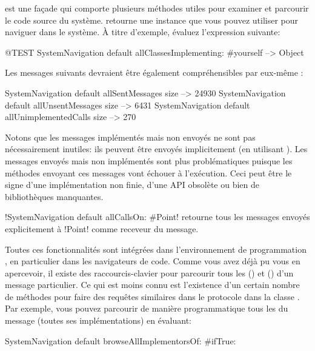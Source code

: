 \documentclass[a4paper,10pt,twoside]{book}
\begin{document}
 est une façade qui comporte plusieurs méthodes utiles pour examiner et parcourir le code source du système.
  retourne une instance que vous pouvez utiliser pour naviguer dans le système. À titre d'exemple, évaluez l'expression suivante:

\begin{code}{@TEST}
SystemNavigation default allClassesImplementing: #yourself --> {Object}
\end{code}

Les messages suivants devraient être également compréhensibles par eux-même :

\begin{code}{}
SystemNavigation default allSentMessages size          --> 24930
SystemNavigation default allUnsentMessages size      --> 6431
SystemNavigation default allUnimplementedCalls size --> 270
\end{code}

Notons que les messages implémentés mais non envoyés ne sont pas nécessairement inutiles: ils peuvent être envoyés implicitement (\eg en utilisant ).
Les messages envoyés mais non implémentés sont plus problématiques puisque les méthodes envoyant ces messages vont échouer à l'exécution. Ceci peut être le signe d'une implémentation non finie, d'une API obsolète ou bien de bibliothèques manquantes.

\ct!SystemNavigation default allCallsOn: #Point! retourne tous les messages envoyés explicitement à \ct!Point! comme receveur du message.

Toutes ces fonctionnalités sont intégrées dans l'environnement de programmation \pharo, en particulier dans les navigateurs de code.
Comme vous avez déjà pu vous en apercevoir, il existe des raccourcis-clavier pour parcourir tous les \immplementors
() et
\sennders
() d'un message particulier.
Ce qui est moins connu est l'existence d'un certain nombre de méthodes pour faire des requêtes similaires dans le protocole  dans la classe .
Par exemple, vous pouvez parcourir de manière programmatique tous les \implementors du message  
(\ie toutes ses implémentations)
en évaluant:
\begin{code}{}
SystemNavigation default browseAllImplementorsOf: #ifTrue:
\end{code}
\end{document}
